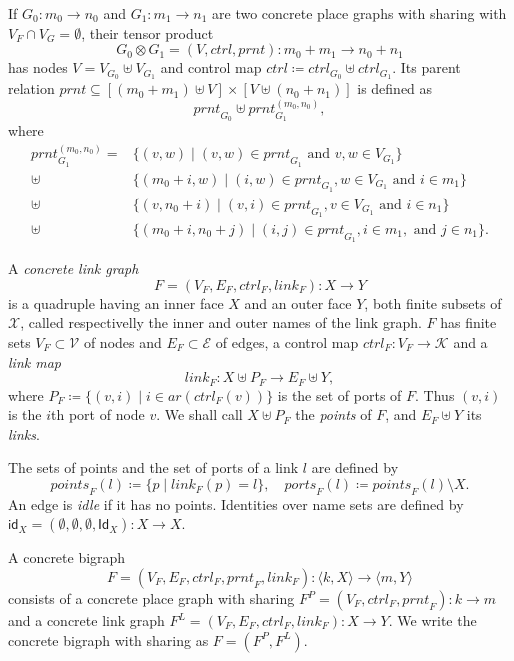 \documentclass[runningheads]{llncs}
\newcommand\ctrl{\mathit{ctrl}}
\newcommand\prnt{\mathit{prnt}}
\newcommand\link{\mathit{link}}
\newcommand\points{\mathit{points}}
\newcommand\ports{\mathit{ports}}
\newcommand\ar{\mathit{ar}}
\newcommand\id{\mathsf{id}}
\newcommand\Id{\mathsf{Id}}
\begin{document}
\begin{definition}
  If $G_0 : m_0 \to n_0$ and $G_1 : m_1 \to n_1$ are two concrete place graphs
  with sharing with $V_F \cap V_G = \emptyset$, their tensor product
  \[ G_0 \otimes G_1 = (V, \ctrl, \prnt) : m_0 + m_1 \to n_0 + n_1 \]
  has nodes $V = V_{G_0} \uplus V_{G_1}$ and control map $\ctrl \coloneqq
  \ctrl_{G_0} \uplus \ctrl_{G_1}$. Its parent relation $\prnt \subseteq [(m_0 +
  m_1) \uplus V] \times [V \uplus (n_0 + n_1)]$ is defined as
  \[ \prnt_{G_0} \uplus \prnt_{G_1}^{(m_0, n_0)}, \]
  where
  \begin{align*}
    \prnt_{G_1}^{(m_0, n_0)} = &\{ (v, w) \mid (v, w) \in \prnt_{G_1} \text{ and } v, w \in V_{G_1} \} \\
    \uplus &\{ (m_0 + i, w) \mid (i, w) \in \prnt_{G_1}, w \in V_{G_1} \text{ and } i \in m_1 \} \\
    \uplus &\{ (v, n_0 + i) \mid (v, i) \in \prnt_{G_1}, v \in V_{G_1} \text{ and } i \in n_1 \} \\
    \uplus &\{ (m_0 + i, n_0 + j) \mid (i, j) \in \prnt_{G_1}, i \in m_1, \text{ and } j \in n_1 \}.
  \end{align*}
\end{definition}

\begin{definition}
  A \emph{concrete link graph}
  \[ F = (V_F, E_F, \ctrl_F, \link_F) : X \to Y \]
  is a quadruple having an inner face $X$ and an outer face $Y$, both finite
  subsets of $\mathcal{X}$, called respectivelly the inner and outer names of
  the link graph. $F$ has finite sets $V_F \subset \mathcal{V}$ of nodes and
  $E_F \subset \mathcal{E}$ of edges, a control map $\ctrl_F : V_F \to
  \mathcal{K}$ and a \emph{link map}
  \[ \link_F : X \uplus P_F \to E_F \uplus Y, \]
  where $P_F \coloneqq \{ (v, i) \mid i \in \ar(\ctrl_F(v)) \}$ is the set of
  ports of $F$. Thus $(v, i)$ is the $i$th port of node $v$. We shall call $X
  \uplus P_F$ the \emph{points} of $F$, and $E_F \uplus Y$ its \emph{links}.
\end{definition}

The sets of points and the set of ports of a link $l$ are defined by
\[ \points_F(l) \coloneqq \{ p \mid \link_F(p) = l \}, \quad \ports_F(l)
  \coloneqq \points_F(l) \setminus X. \]
An edge is \emph{idle} if it has no points. Identities over name sets are
defined by $\id_X = (\emptyset, \emptyset, \emptyset, \Id_X) : X \to X$.

\begin{definition}
  A concrete bigraph
  \[ F = (V_F, E_F, \ctrl_F, \prnt_F, \link_F) : \langle k, X \rangle \to
    \langle m, Y \rangle \]
  consists of a concrete place graph with sharing $F^P = (V_F, \ctrl_F, \prnt_F)
  : k \to m$ and a concrete link graph $F^L = (V_F, E_F, \ctrl_F, \link_F) : X
  \to Y$. We write the concrete bigraph with sharing as $F = (F^P, F^L)$.
\end{definition}
\end{document}
